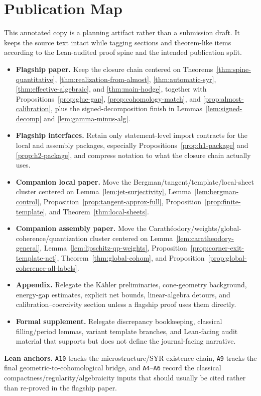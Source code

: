 \documentclass[11pt]{article}
\numberwithin{equation}{section}  %
\theoremstyle{plain}
\theoremstyle{definition}
\theoremstyle{remark}
\begin{document}
\section*{Publication Map}
This annotated copy is a planning artifact rather than a submission draft. It keeps the source text intact while tagging sections and theorem-like items according to the Lean-audited proof spine and the intended publication split.
\begin{itemize}
\item \textbf{Flagship paper.} Keep the closure chain centered on Theorems~\ref{thm:spine-quantitative}, \ref{thm:realization-from-almost}, \ref{thm:automatic-syr}, \ref{thm:effective-algebraic}, and \ref{thm:main-hodge}, together with Propositions~\ref{prop:glue-gap}, \ref{prop:cohomology-match}, and \ref{prop:almost-calibration}, plus the signed-decomposition finish in Lemmas~\ref{lem:signed-decomp} and \ref{lem:gamma-minus-alg}.
\item \textbf{Flagship interfaces.} Retain only statement-level import contracts for the local and assembly packages, especially Propositions~\ref{prop:h1-package} and \ref{prop:h2-package}, and compress notation to what the closure chain actually uses.
\item \textbf{Companion local paper.} Move the Bergman/tangent/template/local-sheet cluster centered on Lemma~\ref{lem:jet-surjectivity}, Lemma~\ref{lem:bergman-control}, Proposition~\ref{prop:tangent-approx-full}, Proposition~\ref{prop:finite-template}, and Theorem~\ref{thm:local-sheets}.
\item \textbf{Companion assembly paper.} Move the Carath\'eodory/weights/global-coherence/quantization cluster centered on Lemma~\ref{lem:caratheodory-general}, Lemma~\ref{lem:lipschitz-qp-weights}, Proposition~\ref{prop:corner-exit-template-net}, Theorem~\ref{thm:global-cohom}, and Proposition~\ref{prop:global-coherence-all-labels}.
\item \textbf{Appendix.} Relegate the K\"ahler preliminaries, cone-geometry background, energy-gap estimates, explicit net bounds, linear-algebra detours, and calibration--coercivity section unless a flagship proof uses them directly.
\item \textbf{Formal supplement.} Relegate discrepancy bookkeeping, classical filling/period lemmas, variant template branches, and Lean-facing audit material that supports but does not define the journal-facing narrative.
\end{itemize}
\noindent\textbf{Lean anchors.} \texttt{A10} tracks the microstructure/SYR existence chain, \texttt{A9} tracks the final geometric-to-cohomological bridge, and \texttt{A4}--\texttt{A6} record the classical compactness/regularity/algebraicity inputs that should usually be cited rather than re-proved in the flagship paper.
\medskip
\end{document}
